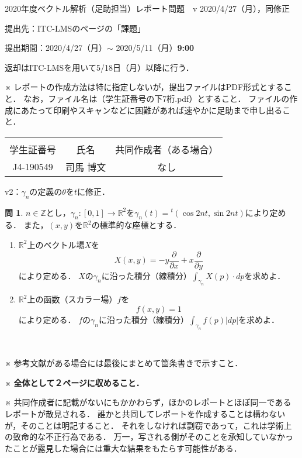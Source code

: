 \documentclass[dvipdfmx,nosetpagesize, uplatex]{jsarticle}
\newcommand\GAKUSEISHOBANGO{J4-190549}%
\newcommand\NAMAE{司馬 博文}%
\newcommand\KYODOSAKUSEISHA{なし}%
\theoremstyle{definition}
\newtheorem*{question*}{問}
\theoremstyle{StatementsWithStar}
\theoremstyle{StatementsWithStar2}
\theoremstyle{StatementsWithStar3}
\theoremstyle{StatementsWithCCirc}
\theoremstyle{definition}
\begin{document}
\thispagestyle{empty}
\setlength{\parindent}{1zw}
\setlength{\baselineskip}{13pt}
\setcounter{section}{2}
\setcounter{version}{1}
\noindent
2020年度ベクトル解析（足助担当）レポート問題~\thesection~v\theversion%
\hfil2020/4/27（月），同修正\par\noindent
提出先：ITC-LMSのページの「課題」\par\noindent
提出期間：2020/4/27（月）$\sim$ 2020/5/11（月）\textbf{9:00}\par\noindent
返却はITC-LMSを用いて5/18日（月）以降に行う．\par\noindent
※ レポートの作成方法は特に指定しないが，提出ファイルはPDF形式とすること．
なお，ファイル名は（学生証番号の下7桁.pdf）とすること．
ファイルの作成にあたって印刷やスキャンなどに困難があれば速やかに足助まで申し出ること．
\vskip-18pt\noindent
\begin{table}[h]
\begin{tabular}{|c|c|c|} \hline
& & \\[-13pt]
学生証番号& 氏名 & 共同作成者（ある場合）\\[2pt] \hline
\rule{0pt}{16pt}%
\parbox[c]{9.2zw}{\GAKUSEISHOBANGO\hfill} & \parbox[c]{13.0zw}{\NAMAE\hfill} & \parbox[c]{25.6zw}{\KYODOSAKUSEISHA\hfill}\\[6pt] \hline
\end{tabular}
\end{table}
\vskip-12pt\noindent
v2：$\gamma_n$の定義の$\theta$を$t$に修正．
% 
\begin{question*}
$n\in\mathbb{Z}$とし，$\gamma_n\colon[0,1]\to\mathbb{R}^2$を$\gamma_n(t)={}^t(\cos2n t,\sin2n t)$により定める．
また，$(x,y)$を$\mathbb{R}^2$の標準的な座標とする．
\begin{enumerate}
\item
$\mathbb{R}^2$上のベクトル場$X$を
\[
X(x,y)=-y\frac{\partial}{\partial x}+x\frac{\partial}{\partial y}
\]
により定める．
$X$の$\gamma_n$に沿った積分（線積分）$\int_{\gamma_n}X(p)\cdot dp$を求めよ．
\item
$\mathbb{R}^2$上の函数（スカラー場）$f$を
\[
f(x,y)=1
\]
により定める．
$f$の$\gamma_n$に沿った積分（線積分）$\int_{\gamma_n}f(p)|dp|$を求めよ．
\end{enumerate}
\end{question*}
\par
\ \par
\noindent
{\small
※ 参考文献がある場合には最後にまとめて箇条書きで示すこと．\par\noindent
※ \textbf{全体として２ページに収めること．}\par\noindent
※ 共同作成者に記載がないにもかかわらず，ほかのレポートとほぼ同一であるレポートが散見される．
誰かと共同してレポートを作成することは構わないが，そのことは明記すること．
それをしなければ剽窃であって，これは学術上の致命的な不正行為である．
万一，写される側がそのことを承知していなかったことが露見した場合には重大な結果をもたらす可能性がある．
}
\end{document}

